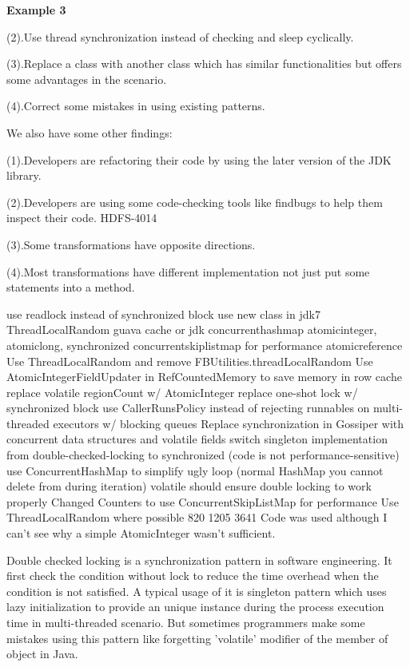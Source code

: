 \documentclass{sig-alternate-05-2015}
\begin{document}
\textbf{Example 3}

(2).Use thread synchronization instead of checking and sleep cyclically.

(3).Replace a class with another class which has similar functionalities but offers some advantages in the scenario.

(4).Correct some mistakes in using existing patterns.

We also have some other findings:

(1).Developers are refactoring their code by using the later version of the JDK library.

(2).Developers are using some code-checking tools like findbugs to help them inspect their code.
HDFS-4014

(3).Some transformations have opposite directions.

(4).Most transformations have different implementation not just put some statements into a method.


use readlock instead of synchronized block
use new class in jdk7 ThreadLocalRandom
guava cache or jdk concurrenthashmap
atomicinteger, atomiclong, synchronized
concurrentskiplistmap for performance
atomicreference
Use ThreadLocalRandom and remove FBUtilities.threadLocalRandom
Use AtomicIntegerFieldUpdater in RefCountedMemory to save memory in row cache
replace volatile regionCount w/ AtomicInteger
replace one-shot lock w/ synchronized block
use CallerRunsPolicy instead of rejecting runnables on multi-threaded executors w/ blocking queues
Replace synchronization in Gossiper with concurrent data structures and volatile fields
switch singleton implementation from double-checked-locking to synchronized (code is not performance-sensitive)
use ConcurrentHashMap to simplify ugly loop (normal HashMap you cannot delete from during iteration)
volatile should ensure double locking to work properly
Changed Counters to use ConcurrentSkipListMap for performance
Use ThreadLocalRandom where possible
820
1205
3641 Code was used although I can't see why a simple AtomicInteger wasn't sufficient.

Double checked locking is a synchronization pattern in software engineering. It first check the condition without lock to reduce the time overhead when the condition is not satisfied. A typical usage of it is singleton pattern which uses lazy initialization to provide an unique instance during the process execution time in multi-threaded scenario. But sometimes programmers make some mistakes using this pattern like forgetting 'volatile' modifier of the member of object in Java.
\end{document}
